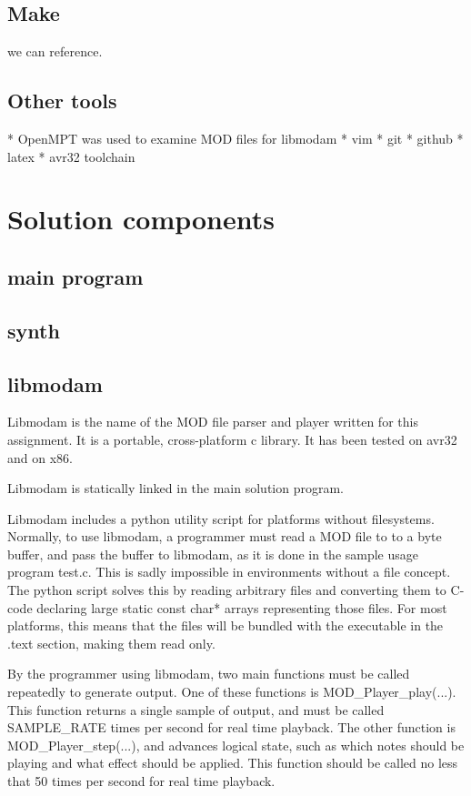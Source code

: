 \subsection{Make}
we can reference.

\subsection{Other tools}
* OpenMPT was used to examine MOD files for libmodam
* vim
* git
* github
* latex
* avr32 toolchain


\section{Solution components}

\subsection{main program}
\subsection{synth}

\subsection{libmodam}

Libmodam is the name of the MOD file parser and player written for this assignment.
It is a portable, cross-platform c library.
It has been tested on avr32 and on x86.

Libmodam is statically linked in the main solution program.

Libmodam includes a python utility script for platforms without filesystems.
Normally, to use libmodam, a programmer must read a MOD file to to a byte buffer, and pass the buffer to libmodam, as it is done in the sample usage program test.c.
This is sadly impossible in environments without a file concept.
The python script solves this by reading arbitrary files and converting them to C-code declaring large static const char* arrays representing those files.
For most platforms, this means that the files will be bundled with the executable in the .text section, making them read only.

By the programmer using libmodam, two main functions must be called repeatedly to generate output.
One of these functions is MOD_Player_play(...).
This function returns a single sample of output, and must be called SAMPLE_RATE times per second for real time playback.
The other function is MOD_Player_step(...), and advances logical state, such as which notes should be playing and what effect should be applied.
This function should be called no less that 50 times per second for real time playback.

